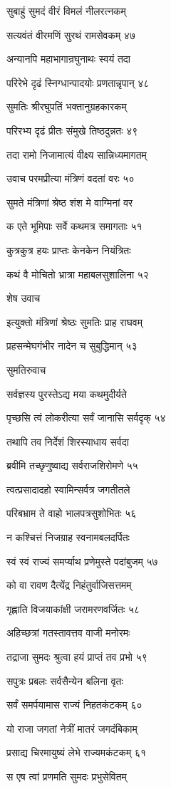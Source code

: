 सुबाहुं सुमदं वीरं विमलं नीलरत्नकम्

सत्यवंतं वीरमणिं सुरथं रामसेवकम् ४७

अन्यानपि महाभागान्रघुनाथः स्वयं तदा

परिरेभे दृढं स्निग्धान्पादयोः प्रणतान्नृपान् ४८

सुमतिः श्रीरघुपतिं भक्तानुग्रहकारकम्

परिरभ्य दृढं प्रीतः संमुखे तिष्ठदुन्नतः ४९

तदा रामो निजामात्यं वीक्ष्य सान्निध्यमागतम्

उवाच परमप्रीत्या मंत्रिणं वदतां वरः ५०

सुमते मंत्रिणां श्रेष्ठ शंश मे वाग्मिनां वर

क एते भूमिपाः सर्वे कथमत्र समागताः ५१

कुत्रकुत्र हयः प्राप्तः केनकेन नियंत्रितः

कथं वै मोचितो भ्रात्रा महाबलसुशालिना ५२

शेष उवाच

इत्युक्तो मंत्रिणां श्रेष्ठः सुमतिः प्राह राघवम्

प्रहसन्मेघगंभीर नादेन च सुबुद्धिमान् ५३

सुमतिरुवाच

सर्वज्ञस्य पुरस्तेऽद्य मया कथमुदीर्यते

पृच्छसि त्वं लोकरीत्या सर्वं जानासि सर्वदृक् ५४

तथापि तव निर्देशं शिरस्याधाय सर्वदा

ब्रवीमि तच्छृणुष्वाद्य सर्वराजशिरोमणे ५५

त्वत्प्रसादादहो स्वामिन्सर्वत्र जगतीतले

परिबभ्राम ते वाहो भालपत्रसुशोभितः ५६

न कश्चित्तं निजग्राह स्वनामबलदर्पितः

स्वं स्वं राज्यं समर्प्याथ प्रणेमुस्ते पदांबुजम् ५७

को वा रावण दैत्येंद्र निहंतुर्वाजिसत्तमम्

गृह्णाति विजयाकांक्षी जरामरणवर्जितः ५८

अहिच्छत्रां गतस्तावत्तव वाजी मनोरमः

तद्राजा सुमदः श्रुत्वा हयं प्राप्तं तव प्रभो ५९

सपुत्रः प्रबलः सर्वसैन्येन बलिना वृतः

सर्वं समर्पयामास राज्यं निहतकंटकम् ६०

यो राजा जगतां नेत्रीं मातरं जगदंबिकाम्

प्रसाद्य चिरमायुष्यं लेभे राज्यमकंटकम् ६१

स एष त्वां प्रणमति सुमदः प्रभुसेवितम्

